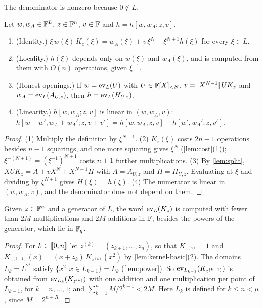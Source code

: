 The denominator is nonzero because $0 \notin L$.

\begin{lemma}\label{lem:virtual}
Let $w, w_A \in \mathbb{F}^L$, $z \in \mathbb{F}^n$, $v \in \mathbb{F}$ and $h = h[w,w_A;z,v]$.
\begin{enumerate}
  \item (Identity.) $\xi\, w(\xi)\, K_z(\xi) = w_A(\xi) + v\,\xi^N + \xi^{N+1} h(\xi)$ for every $\xi \in L$.
  \item (Locality.) $h(\xi)$ depends only on $w(\xi)$ and $w_A(\xi)$, and is computed from them with $O(n)$ operations, given $\xi^{-1}$.
  \item (Honest openings.) If $w = \mathrm{ev}_L(U)$ with $U \in \mathbb{F}[X]_{<N}$, $v = [X^{N-1}]\,U K_z$ and $w_A = \mathrm{ev}_L(A_{U,z})$, then $h = \mathrm{ev}_L(H_{U,z})$.
  \item (Linearity.) $h[w,w_A;z,v]$ is linear in $(w, w_A, v)$: $h[w + w', w_A + w_A'; z, v + v'] = h[w,w_A;z,v] + h[w',w_A';z,v']$.
\end{enumerate}
\end{lemma}

\begin{proof}
(1) Multiply the definition by $\xi^{N+1}$.
(2) $K_z(\xi)$ costs $2n-1$ operations besides $n-1$ squarings, and one more squaring gives $\xi^N$ (\cref{lem:cost}(1)); $\xi^{-(N+1)} = (\xi^{-1})^{N+1}$ costs $n+1$ further multiplications.
(3) By \cref{lem:split}, $X U K_z = A + vX^N + X^{N+1}H$ with $A = A_{U,z}$ and $H = H_{U,z}$. Evaluating at $\xi$ and dividing by $\xi^{N+1}$ gives $H(\xi) = h(\xi)$.
(4) The numerator is linear in $(w, w_A, v)$, and the denominator does not depend on them.
\end{proof}

\begin{lemma}\label{lem:kernel-domain}
Given $z \in \mathbb{F}^n$ and a generator of $L$, the word $\mathrm{ev}_L(K_z)$ is computed with fewer than $2M$ multiplications and $2M$ additions in $\mathbb{F}$, besides the powers of the generator, which lie in $\mathbb{F}_q$.
\end{lemma}

\begin{proof}
For $k \in \llbracket 0, n \rrbracket$ let $z^{(k)} = (z_{k+1},\dots,z_n)$, so that $K_{z^{(n)}} = 1$ and $K_{z^{(k-1)}}(x) = (x + z_k)\, K_{z^{(k)}}(x^2)$ by \cref{lem:kernel-basic}(2).
The domains $L_k = L^{2^k}$ satisfy $\{x^2 : x \in L_{k-1}\} = L_k$ (\cref{lem:power}).
So $\mathrm{ev}_{L_{k-1}}(K_{z^{(k-1)}})$ is obtained from $\mathrm{ev}_{L_k}(K_{z^{(k)}})$ with one addition and one multiplication per point of $L_{k-1}$, for $k = n, \dots, 1$; and $\sum_{k=1}^{n} M/2^{k-1} < 2M$.
Here $L_k$ is defined for $k \le n < \mu$, since $M = 2^{n+R}$.
\end{proof}

